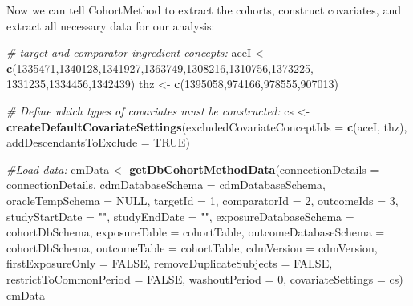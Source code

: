 \documentclass[]{book}
\newenvironment{Shaded}{\begin{snugshade}}{\end{snugshade}}
\newcommand{\CommentTok}[1]{\textcolor[rgb]{0.56,0.35,0.01}{\textit{#1}}}
\newcommand{\DataTypeTok}[1]{\textcolor[rgb]{0.13,0.29,0.53}{#1}}
\newcommand{\DecValTok}[1]{\textcolor[rgb]{0.00,0.00,0.81}{#1}}
\newcommand{\KeywordTok}[1]{\textcolor[rgb]{0.13,0.29,0.53}{\textbf{#1}}}
\newcommand{\NormalTok}[1]{#1}
\newcommand{\OtherTok}[1]{\textcolor[rgb]{0.56,0.35,0.01}{#1}}
\newcommand{\StringTok}[1]{\textcolor[rgb]{0.31,0.60,0.02}{#1}}
\begin{document}
Now we can tell CohortMethod to extract the cohorts, construct covariates, and extract all necessary data for our analysis:

\begin{Shaded}
\begin{Highlighting}[]
\CommentTok{# target and comparator ingredient concepts:}
\NormalTok{aceI <-}\StringTok{ }\KeywordTok{c}\NormalTok{(}\DecValTok{1335471}\NormalTok{,}\DecValTok{1340128}\NormalTok{,}\DecValTok{1341927}\NormalTok{,}\DecValTok{1363749}\NormalTok{,}\DecValTok{1308216}\NormalTok{,}\DecValTok{1310756}\NormalTok{,}\DecValTok{1373225}\NormalTok{,}
          \DecValTok{1331235}\NormalTok{,}\DecValTok{1334456}\NormalTok{,}\DecValTok{1342439}\NormalTok{)}
\NormalTok{thz <-}\StringTok{ }\KeywordTok{c}\NormalTok{(}\DecValTok{1395058}\NormalTok{,}\DecValTok{974166}\NormalTok{,}\DecValTok{978555}\NormalTok{,}\DecValTok{907013}\NormalTok{)}

\CommentTok{# Define which types of covariates must be constructed:}
\NormalTok{cs <-}\StringTok{ }\KeywordTok{createDefaultCovariateSettings}\NormalTok{(}\DataTypeTok{excludedCovariateConceptIds =} \KeywordTok{c}\NormalTok{(aceI,}
\NormalTok{                                                                     thz),}
                                     \DataTypeTok{addDescendantsToExclude =} \OtherTok{TRUE}\NormalTok{)}

\CommentTok{#Load data:}
\NormalTok{cmData <-}\StringTok{ }\KeywordTok{getDbCohortMethodData}\NormalTok{(}\DataTypeTok{connectionDetails =}\NormalTok{ connectionDetails,}
                                \DataTypeTok{cdmDatabaseSchema =}\NormalTok{ cdmDatabaseSchema,}
                                \DataTypeTok{oracleTempSchema =} \OtherTok{NULL}\NormalTok{,}
                                \DataTypeTok{targetId =} \DecValTok{1}\NormalTok{,}
                                \DataTypeTok{comparatorId =} \DecValTok{2}\NormalTok{,}
                                \DataTypeTok{outcomeIds =} \DecValTok{3}\NormalTok{,}
                                \DataTypeTok{studyStartDate =} \StringTok{""}\NormalTok{,}
                                \DataTypeTok{studyEndDate =} \StringTok{""}\NormalTok{,}
                                \DataTypeTok{exposureDatabaseSchema =}\NormalTok{ cohortDbSchema,}
                                \DataTypeTok{exposureTable =}\NormalTok{ cohortTable,}
                                \DataTypeTok{outcomeDatabaseSchema =}\NormalTok{ cohortDbSchema,}
                                \DataTypeTok{outcomeTable =}\NormalTok{ cohortTable,}
                                \DataTypeTok{cdmVersion =}\NormalTok{ cdmVersion,}
                                \DataTypeTok{firstExposureOnly =} \OtherTok{FALSE}\NormalTok{,}
                                \DataTypeTok{removeDuplicateSubjects =} \OtherTok{FALSE}\NormalTok{,}
                                \DataTypeTok{restrictToCommonPeriod =} \OtherTok{FALSE}\NormalTok{,}
                                \DataTypeTok{washoutPeriod =} \DecValTok{0}\NormalTok{,}
                                \DataTypeTok{covariateSettings =}\NormalTok{ cs)}
\NormalTok{cmData}
\end{Highlighting}
\end{Shaded}
\end{document}
